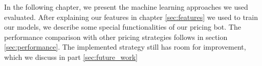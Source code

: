In the following chapter, we present the machine learning approaches we used evaluated. After explaining our features in chapter \ref{sec:features} we used to train our models, we describe some special functionalities of our pricing bot. The performance comparison with other pricing strategies follows in section \ref{sec:performance}. The implemented strategy still has room for improvement, which we discuss in part \ref{sec:future_work}
